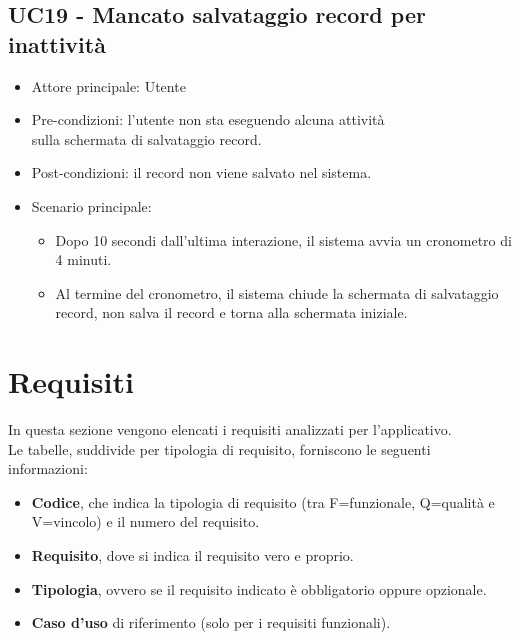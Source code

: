 \subsection{UC19 - Mancato salvataggio record per inattività}
\begin{itemize}
    \item Attore principale: Utente
    \item Pre-condizioni: l'utente non sta eseguendo alcuna attività \\ sulla schermata di salvataggio record.
    \item Post-condizioni: il record non viene salvato nel sistema.
    \item Scenario principale: \begin{itemize}
        \item Dopo 10 secondi dall'ultima interazione, il sistema avvia un cronometro di 4 minuti.
        \item Al termine del cronometro, il sistema chiude la schermata di salvataggio record, non salva il record e torna alla schermata iniziale.
    \end{itemize}
\end{itemize}
\newpage
\section{Requisiti}
In questa sezione vengono elencati i requisiti analizzati per l'applicativo.\\
Le tabelle, suddivide per tipologia di requisito, forniscono le seguenti informazioni:
\begin{itemize}
    \item \textbf{Codice}, che indica la tipologia di requisito (tra F=funzionale, Q=qualità e V=vincolo) e il numero del requisito.
    \item \textbf{Requisito}, dove si indica il requisito vero e proprio.
    \item \textbf{Tipologia}, ovvero se il requisito indicato è obbligatorio oppure opzionale.
    \item \textbf{Caso d'uso} di riferimento (solo per i requisiti funzionali).
\end{itemize}
